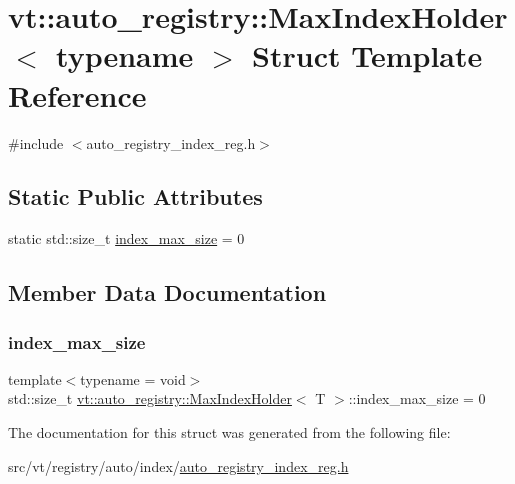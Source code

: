 \hypertarget{structvt_1_1auto__registry_1_1_max_index_holder}{}\section{vt\+:\+:auto\+\_\+registry\+:\+:Max\+Index\+Holder$<$ typename $>$ Struct Template Reference}
\label{structvt_1_1auto__registry_1_1_max_index_holder}


{\ttfamily \#include $<$auto\+\_\+registry\+\_\+index\+\_\+reg.\+h$>$}

\subsection*{Static Public Attributes}
\begin{DoxyCompactItemize}
\item 
static std\+::size\+\_\+t \hyperlink{structvt_1_1auto__registry_1_1_max_index_holder_a44a1c78f9cd85a6c7f0f68315254c0f9}{index\+\_\+max\+\_\+size} = 0
\end{DoxyCompactItemize}


\subsection{Member Data Documentation}
\mbox{\label{structvt_1_1auto__registry_1_1_max_index_holder_a44a1c78f9cd85a6c7f0f68315254c0f9}} 
\subsubsection{\texorpdfstring{index\+\_\+max\+\_\+size}{index\_max\_size}}
{\footnotesize\ttfamily template$<$typename  = void$>$ \\
std\+::size\+\_\+t \hyperlink{structvt_1_1auto__registry_1_1_max_index_holder}{vt\+::auto\+\_\+registry\+::\+Max\+Index\+Holder}$<$ T $>$\+::index\+\_\+max\+\_\+size = 0\hspace{0.3cm}{\ttfamily [static]}}



The documentation for this struct was generated from the following file\+:\begin{DoxyCompactItemize}
\item 
src/vt/registry/auto/index/\hyperlink{auto__registry__index__reg_8h}{auto\+\_\+registry\+\_\+index\+\_\+reg.\+h}\end{DoxyCompactItemize}
